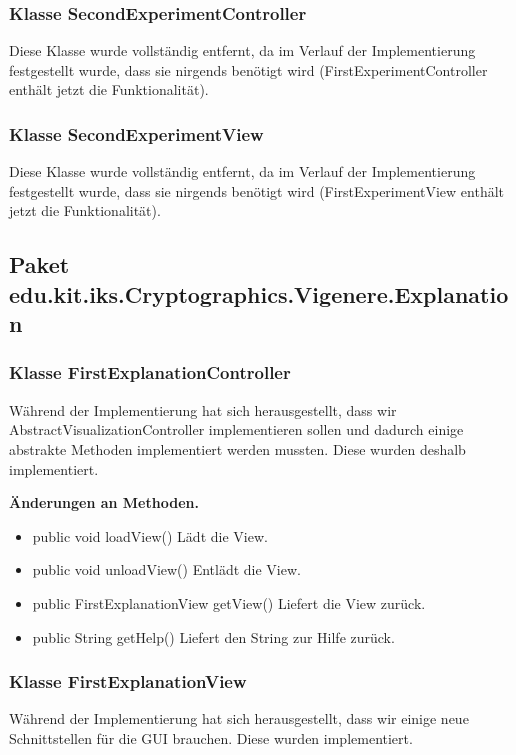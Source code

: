 \documentclass{article}
\begin{document}
    \subsubsection{Klasse SecondExperimentController}
	Diese Klasse wurde vollständig entfernt, da im Verlauf der Implementierung festgestellt wurde,
	dass sie nirgends benötigt wird (FirstExperimentController enthält jetzt die Funktionalität).
	
    \subsubsection{Klasse SecondExperimentView}
	Diese Klasse wurde vollständig entfernt, da im Verlauf der Implementierung festgestellt wurde,
	dass sie nirgends benötigt wird (FirstExperimentView enthält jetzt die Funktionalität).
  \subsection{Paket edu.kit.iks.Cryptographics.Vigenere.Explanation}
    \subsubsection{Klasse FirstExplanationController}
	Während der Implementierung hat sich herausgestellt, dass wir AbstractVisualizationController implementieren sollen und dadurch 
	einige abstrakte Methoden implementiert werden mussten. Diese wurden deshalb implementiert.\newline
           
    \textbf{Änderungen an Methoden.}
      \begin{itemize}
		\item public void loadView()\newline
              Lädt die View.
        \item public void unloadView()\newline
              Entlädt die View.
        \item public FirstExplanationView getView()\newline
              Liefert die View zurück.
        \item public String getHelp()\newline
              Liefert den String zur Hilfe zurück.
      \end{itemize}
	  
    \subsubsection{Klasse FirstExplanationView}
	Während der Implementierung hat sich herausgestellt, dass wir einige neue Schnittstellen für die GUI brauchen. Diese wurden implementiert.\newline
           
\end{document}
